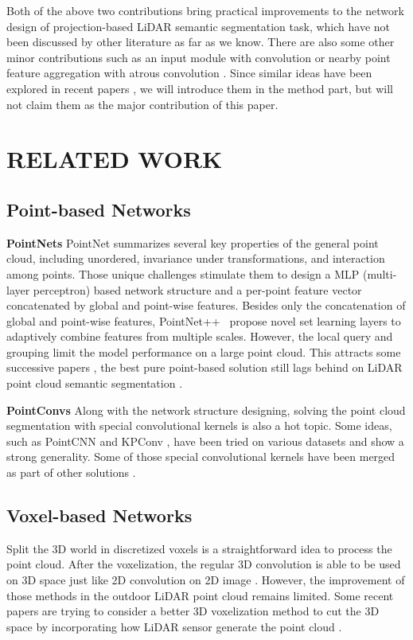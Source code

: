 \documentclass[letterpaper, 10 pt, conference]{ieeeconf}
\begin{document}
Both of the above two contributions bring practical improvements to the network design of projection-based LiDAR semantic segmentation task, which have not been discussed by other literature as far as we know. There are also some other minor contributions such as an input module with  convolution or nearby point feature aggregation with atrous convolution \cite{chen2017rethinking}. Since similar ideas have been explored in recent papers \cite{alonso20203d}, we will introduce them in the method part, but will not claim them as the major contribution of this paper. 

\section{RELATED WORK}


\subsection{Point-based Networks} 
\textbf{PointNets} PointNet \cite{qi2017pointnet} summarizes several key properties of the general point cloud, including unordered, invariance under transformations, and interaction among points. Those unique challenges stimulate them to design a MLP (multi-layer perceptron) based network structure and a per-point feature vector concatenated by global and point-wise features. Besides only the concatenation of global and point-wise features, PointNet++ \cite{qi2017pointnet++}  propose novel set learning layers to adaptively combine features from multiple scales. However, the local query and grouping limit the model performance on a large point cloud. This attracts some successive papers \cite{landrieu2018large, hu2020randla}, the best pure point-based solution still lags behind on LiDAR point cloud semantic segmentation \cite{hu2020randla}.

\textbf{PointConvs} Along with the network structure designing, solving the point cloud segmentation with special convolutional kernels is also a hot topic. Some ideas, such as PointCNN \cite{li2018pointcnn} and KPConv \cite{thomas2019kpconv}, have been tried on various datasets and show a strong generality. Some of those special convolutional kernels have been merged as part of other solutions \cite{kochanov2020kprnet}.   

\subsection{Voxel-based Networks}
Split the 3D world in discretized voxels is a straightforward idea to process the point cloud. After the voxelization, the regular 3D convolution is able to be used on 3D space just like 2D convolution on 2D image \cite{graham20183d, han2020occuseg}. However, the improvement of those methods in the outdoor LiDAR point cloud remains limited. Some recent papers are trying to consider a better 3D voxelization method to cut the 3D space by incorporating how LiDAR sensor generate the point cloud \cite{zhu2020cylindrical}. 
\end{document}

